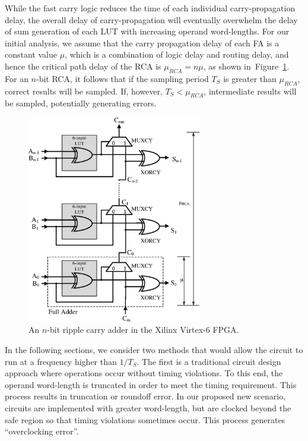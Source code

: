\documentclass[journal]{IEEEtran}
\begin{document}
While the fast carry logic reduces the time of each individual carry-propagation delay, the overall delay of carry-propagation will eventually overwhelm the delay of sum generation of each LUT with increasing operand word-lengths. For our initial analysis, we assume that the carry propagation delay of each FA is a constant value $\mu$, which is a combination of logic delay and routing delay, and hence the critical path delay of the RCA is $\mu_{RCA}=n\mu$, as shown in~Figure~\ref{FPGA adder}. For an $n$-bit RCA, it follows that if the sampling period $T_S$ is greater than $\mu_{RCA}$, correct results will be sampled. If, however, $T_S<\mu_{RCA}$, intermediate results will be sampled, potentially generating errors.
%
\begin{figure}[t]
  \centering
  \includegraphics[width=3in]{./Figures/FastCarryLogic3.eps}
  \caption{An $n$-bit ripple carry adder in the Xilinx Virtex-6 FPGA.}
  \label{FPGA adder}
\end{figure}

In the following sections, we consider two methods that would allow the circuit to run at a frequency higher than $1/{T_S}$. The first is a traditional circuit design approach where operations occur without timing violations. To this end, the operand word-length is truncated in order to meet the timing requirement. This process results in truncation or roundoff error. In our proposed new scenario, circuits are implemented with greater word-length, but are clocked beyond the safe region so that timing violations sometimes occur. This process generates ``overclocking error''.
\end{document}
